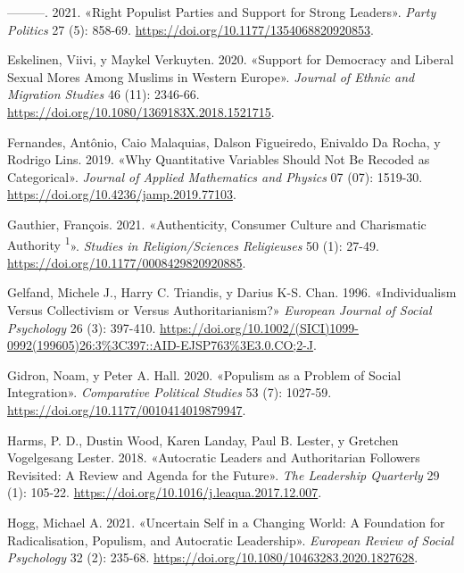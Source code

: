 \documentclass[
  letterpaper,
  DIV=11,
  numbers=noendperiod]{scrartcl}
\newlength{\cslhangindent}
\newenvironment{CSLReferences}[2] %
 {\begin{list}{}{%
  \setlength{\itemindent}{0pt}
  \setlength{\leftmargin}{0pt}
  \setlength{\parsep}{0pt}
  \ifodd #1
   \setlength{\leftmargin}{\cslhangindent}
   \setlength{\itemindent}{-1\cslhangindent}
  \fi
  \setlength{\itemsep}{#2\baselineskip}}}
 {\end{list}}
\begin{document}
\begin{CSLReferences}{1}{0}
---------. 2021. {«Right Populist Parties and Support for Strong
Leaders»}. \emph{Party Politics} 27 (5): 858-69.
\url{https://doi.org/10.1177/1354068820920853}.

Eskelinen, Viivi, y Maykel Verkuyten. 2020. {«Support for Democracy and
Liberal Sexual Mores Among {Muslims} in {Western Europe}»}.
\emph{Journal of Ethnic and Migration Studies} 46 (11): 2346-66.
\url{https://doi.org/10.1080/1369183X.2018.1521715}.

Fernandes, Antônio, Caio Malaquias, Dalson Figueiredo, Enivaldo Da
Rocha, y Rodrigo Lins. 2019. {«Why {Quantitative Variables Should Not Be
Recoded} as {Categorical}»}. \emph{Journal of Applied Mathematics and
Physics} 07 (07): 1519-30.
\url{https://doi.org/10.4236/jamp.2019.77103}.

Gauthier, François. 2021. {«{Authenticity, Consumer Culture and
Charismatic Authority \textsuperscript{1}}»}. \emph{Studies in
Religion/Sciences Religieuses} 50 (1): 27-49.
\url{https://doi.org/10.1177/0008429820920885}.

Gelfand, Michele J., Harry C. Triandis, y Darius K-S. Chan. 1996.
{«Individualism Versus Collectivism or Versus Authoritarianism?»}
\emph{European Journal of Social Psychology} 26 (3): 397-410.
\url{https://doi.org/10.1002/(SICI)1099-0992(199605)26:3\%3C397::AID-EJSP763\%3E3.0.CO;2-J}.

Gidron, Noam, y Peter A. Hall. 2020. {«Populism as a {Problem} of
{Social Integration}»}. \emph{Comparative Political Studies} 53 (7):
1027-59. \url{https://doi.org/10.1177/0010414019879947}.

Harms, P. D., Dustin Wood, Karen Landay, Paul B. Lester, y Gretchen
Vogelgesang Lester. 2018. {«Autocratic Leaders and Authoritarian
Followers Revisited: {A} Review and Agenda for the Future»}. \emph{The
Leadership Quarterly} 29 (1): 105-22.
\url{https://doi.org/10.1016/j.leaqua.2017.12.007}.

Hogg, Michael A. 2021. {«Uncertain {Self} in a {Changing World}: {A
Foundation} for {Radicalisation}, {Populism}, and {Autocratic
Leadership}»}. \emph{European Review of Social Psychology} 32 (2):
235-68. \url{https://doi.org/10.1080/10463283.2020.1827628}.


\end{CSLReferences}
\end{document}
